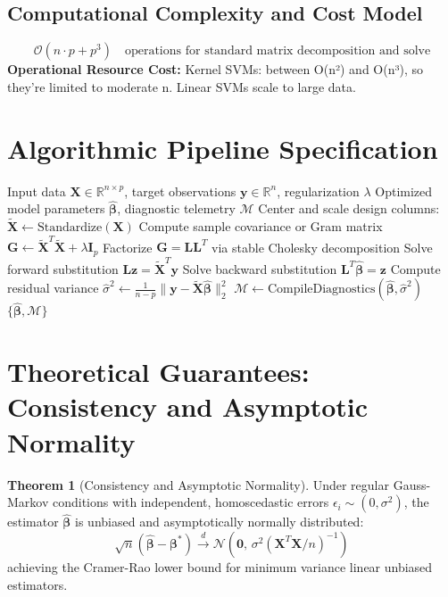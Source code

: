 \documentclass[11pt,a4paper]{article}
\theoremstyle{definition}
\newtheorem{theorem}{\textbf{Theorem}}[section]
\begin{document}
\subsection{Computational Complexity and Cost Model}
\begin{equation}
\mathcal{O}(n \cdot p + p^3) \quad \text{operations for standard matrix decomposition and solve}
\end{equation}
\textbf{Operational Resource Cost:} Kernel SVMs: between O(n²) and O(n³), so they're limited to moderate n. Linear SVMs scale to large data.

\section{Algorithmic Pipeline Specification}

\begin{algorithm}[H]
\caption{Support vector machines Execution}
\begin{algorithmic}[1]
\Require Input data $\mathbf{X} \in \mathbb{R}^{n \times p}$, target observations $\mathbf{y} \in \mathbb{R}^n$, regularization $\lambda$
\Ensure Optimized model parameters $\hat{\boldsymbol{\beta}}$, diagnostic telemetry $\mathcal{M}$
\State Center and scale design columns: $\tilde{\mathbf{X}} \gets \text{Standardize}(\mathbf{X})$
\State Compute sample covariance or Gram matrix $\mathbf{G} \gets \tilde{\mathbf{X}}^T \tilde{\mathbf{X}} + \lambda \mathbf{I}_p$
\State Factorize $\mathbf{G} = \mathbf{L} \mathbf{L}^T$ via stable Cholesky decomposition
\State Solve forward substitution $\mathbf{L} \mathbf{z} = \tilde{\mathbf{X}}^T \mathbf{y}$
\State Solve backward substitution $\mathbf{L}^T \hat{\boldsymbol{\beta}} = \mathbf{z}$
\State Compute residual variance $\hat{\sigma}^2 \gets \frac{1}{n - p} \| \mathbf{y} - \tilde{\mathbf{X}} \hat{\boldsymbol{\beta}} \|_2^2$
\State $\mathcal{M} \gets \text{CompileDiagnostics}(\hat{\boldsymbol{\beta}}, \hat{\sigma}^2)$
\State \Return $\{\hat{\boldsymbol{\beta}}, \mathcal{M}\}$
\end{algorithmic}
\end{algorithm}

\section{Theoretical Guarantees: Consistency and Asymptotic Normality}

\begin{theorem}[Consistency and Asymptotic Normality]
Under regular Gauss-Markov conditions with independent, homoscedastic errors $\epsilon_i \sim (0, \sigma^2)$, the estimator $\hat{\boldsymbol{\beta}}$ is unbiased and asymptotically normally distributed:
\begin{equation}
\sqrt{n}(\hat{\boldsymbol{\beta}} - \boldsymbol{\beta}^*) \xrightarrow{d} \mathcal{N}\left(\mathbf{0}, \, \sigma^2 (\mathbf{X}^T \mathbf{X} / n)^{-1}\right)
\end{equation}
achieving the Cramer-Rao lower bound for minimum variance linear unbiased estimators.
\end{theorem}
\end{document}
